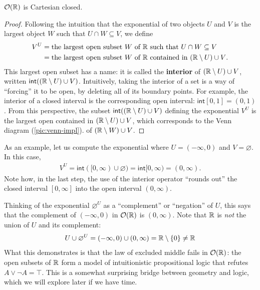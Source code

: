 \begin{proposition}
  \(\mathcal O(\mathbb R)\) is Cartesian closed.
\end{proposition}
\begin{proof}
  Following the intuition that the exponential of two objects \(U\) and \(V\)
  is the largest object \(W\) such that \(U\cap W \subseteq V\),
  we define
  \begin{align}
  V^U &= \text{the largest open subset \(W\) of \(\mathbb R\) such that \(U\cap W\subseteq V\)} \\
      &= \text{the largest open subset \(W\) of \(\mathbb R\) contained in \((\mathbb R\setminus U) \cup V\)}.
  \end{align}
  This largest open subset has a name: it is called the
  \textbf{interior} of \((\mathbb R\setminus U) \cup V\),
  written \(\mathsf{int}((\mathbb R\setminus U) \cup V)\).
  Intuitively, taking the interior of a set is a way of ``forcing'' it to be open,
  by deleting all of its boundary points. For example, the interior of a closed interval is the corresponding
  open interval: \(\mathsf{int}[0,1] = (0,1)\).
  From this perspective, the subset \(\mathsf{int}((\mathbb R\setminus U) \cup V)\) defining the exponential \(V^U\)
  is the largest open contained in \((\mathbb R\setminus U) \cup V\), which corresponds to the Venn diagram (\ref{pic:venn-impl}).
  of \((\mathbb R\setminus W) \cup V\).
\end{proof}
As an example, let us compute the exponential where \(U = (-\infty,0)\) and \(V=\varnothing\).
In this case,
\begin{align}
  V^U = \mathsf{int}([0,\infty) \cup \varnothing)
      = \mathsf{int}[0,\infty)
      = (0,\infty).
\end{align}
Note how, in the last step, the use of the interior operator ``rounds out'' the closed interval \([0,\infty]\)
into the open interval \((0,\infty)\).

Thinking of the exponential \(\varnothing^U\) as a ``complement'' or ``negation'' of \(U\),
this says that the complement of \((-\infty,0)\) in \(\mathcal O(\mathbb R)\) is \((0,\infty)\).
Note that \(\mathbb R\) is \emph{not} the union of \(U\) and its complement:
\[
U \cup \varnothing^U
=
(-\infty,0) \cup (0,\infty)
=
\mathbb R\setminus\{0\}
\ne \mathbb R
\]
What this demonstrates is that the law of excluded middle fails in \(\mathcal
O(\mathbb R)\): the open subsets of \(\mathbb R\) form a model of intuitionistic propositional
logic that refutes \(A \lor \neg A = \top\). This is a somewhat surprising 
bridge between geometry and logic, which we will explore later if we have 
time.

